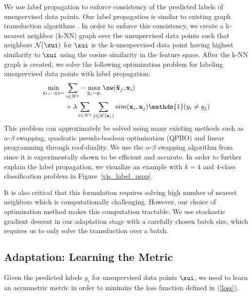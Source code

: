 We use label propagation to enforce consistency of the predicted labels of unsupervised data points. Our label propagation is similar to existing graph transduction algorithms \cite{label_prop1,label_prop2}. In order to enforce this consistency, we create a k-nearest neighbor (k-NN) graph over the unsupervised data points such that neighbors $\mathcal{N}(\xui)$ for $\xui$ is the k-unsupervised data point having highest similarity to $\xui$ using the cosine similarity in the feature space. After the k-NN graph is created, we solve the following optimization problem for labeling unsupervised data points with label propagation:
\begin{equation}
\begin{aligned}
\min_{y_1, \ldots y_{N^u}}  &\sum_{i \in N^u} - \max_{\hat{y}_j=y_i}  \sw(\mathbf{\hat{x}}_j,\mathbf{x}_{i}) \\
&+ \lambda
\sum_{i \in N^u} \sum_{j \in \mathcal{N}(\mathbf{x}_i)} sim(\mathbf{x}_i, \mathbf{x}_j) \mathds{1}(y_i \neq y_j)
\end{aligned}
\label{robtran}
\end{equation}
This problem can approximately be solved using many existing methods such as $\alpha$-$\beta$ swapping, quadratic pseudo-boolean optimization (QPBO) and linear programming through roof-duality. We use the $\alpha$-$\beta$ swapping algorithm from \cite{kolmogrovalphabeta} since it is experimentally shown to be efficient and accurate. In order to further explain the label propagation, we visualize an example with $k=4$ and $4$-class classification problem in Figure~\ref{vis_label_prop}. 

It is also critical that this formulation requires solving high number of nearest neighbors which is computationally challenging. However, our choice of optimization method makes this computation tractable. We use stochastic gradient descent in our adaptation stage with a carefully chosen batch size, which requires us to only solve the transduction over a batch. %

\subsection{Adaptation: Learning the Metric}
\label{metric}
Given the predicted labels $y_i$ for unsupervised data points $\xui$, we need to learn an asymmetric metric in order to minimize the loss function defined in (\ref{loss}). 

